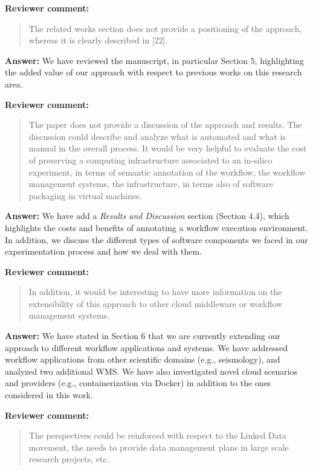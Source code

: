 \documentclass{letter}
\newenvironment{review}%
{\textbf{Reviewer comment:}\begin{quote}}%
{\end{quote}}%
\newcommand{\answer}[1]{%
      \textbf{Answer:} #1}
\begin{document}
\begin{letter}{}
\begin{review}
The related works section does not provide a positioning of the approach, whereas it is clearly described in [22].
\end{review}

\answer{We have reviewed the  manuscript, in particular Section 5, highlighting the added value of our approach with respect to previous works on this research area.}


\begin{review}
The paper does not provide a discussion of the approach and results. The discussion could describe and analyze what is automated and what is manual in the overall process. It would be very helpful to evaluate the cost of preserving a computing infrastructure associated to an in-silico experiment, in terms of semantic annotation of the workflow, the workflow management systems, the infrastructure, in terms also of software packaging in virtual machines.
\end{review}

\answer{We have add a \emph{Results and Discussion} section (Section 4.4), which highlights the costs and benefits of annotating a workflow execution environment. In addition, we discuss the different types of software components we faced in our experimentation process and how we deal with them.}


\begin{review}
In addition, it would be interesting to have more information on the extensibility of this approach to other cloud middleware or workflow management systems.
\end{review}

\answer{We have stated in Section 6 that we are currently extending our approach to different workflow applications and systems. We have addressed workflow applications from other scientific domains (e.g., seismology), and analyzed two additional WMS. We have also investigated novel cloud scenarios and providers (e.g., containerization via Docker) in addition to the ones considered in this work.}


\begin{review}
The perspectives could be reinforced with respect to the Linked Data movement, the needs to provide data management plans in large scale research projects, etc.
\end{review}


\end{letter}
\end{document}
